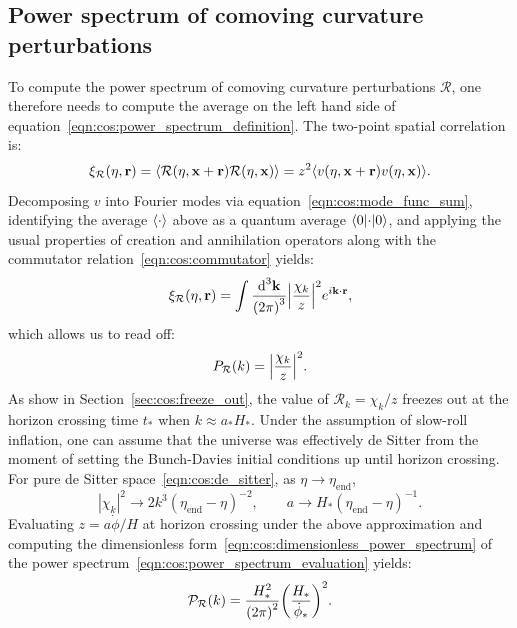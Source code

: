 \subsection{Power spectrum of comoving curvature perturbations}
To compute the power spectrum of comoving curvature perturbations \(\mathcal{R}\), one therefore needs to compute the average on the left hand side of equation~\eqref{eqn:cos:power_spectrum_definition}. The two-point spatial correlation is:
\begin{equation}
  \xi_\mathcal{R}(\eta,\vr) = \mean{\mathcal{R}(\eta,\vx+\vr)\mathcal{R}(\eta,\vx)} = z^2\mean{v(\eta,\vx+\vr)v(\eta,\vx)}.
\end{equation}
Decomposing \(v\) into Fourier modes via equation~\eqref{eqn:cos:mode_func_sum}, identifying the average \(\mean{\cdot}\) above as a quantum average \(\bracket{0}{\cdot}{0}\), and applying the usual properties of creation and annihilation operators along with the commutator relation~\eqref{eqn:cos:commutator} yields:
\begin{equation}
  \xi_\mathcal{R}(\eta,\vr) = \int \frac{\d[3]{\vk}}{{(2\pi)}^3} {\left|\frac{\chi_k}{z}\right|}^2 e^{i\vk\cdot\vr}, 
\end{equation}
which allows us to read off:
\begin{equation}
  \Punnorm_\mathcal{R}(k) = {\left|\frac{\chi_k}{z}\right|}^2.
  \label{eqn:cos:power_spectrum_evaluation}
\end{equation}
As show in Section~\ref{sec:cos:freeze_out}, the value of \(\mathcal{R}_k = \chi_k/z\) freezes out at the horizon crossing time \(t_*\) when \(k\approx a_*H_*\). Under the assumption of slow-roll inflation, one can assume that the universe was effectively de Sitter from the moment of setting the Bunch-Davies initial conditions up until horizon crossing. For pure de Sitter space~\eqref{eqn:cos:de_sitter}, as \(\eta\to\eta_\mathrm{end}\),
\begin{equation}
  |\chi_k|^2 \rightarrow 2k^3 {(\eta_\mathrm{end}-\eta)}^{-2},\qquad
  a \rightarrow H_*{(\eta_\mathrm{end}-\eta)}^{-1}.
\end{equation}
Evaluating \(z = a \dot{\phi} / H\) at horizon crossing under the above approximation and computing the dimensionless form~\eqref{eqn:cos:dimensionless_power_spectrum} of the power spectrum~\eqref{eqn:cos:power_spectrum_evaluation} yields:
\begin{equation}
  \PR(k) = \frac{H_*^2}{{(2\pi)}^2}{\left( \frac{H_*}{\dot{\phi}_*} \right)}^2.
  \label{eqn:cos:inflation_power}
\end{equation}
